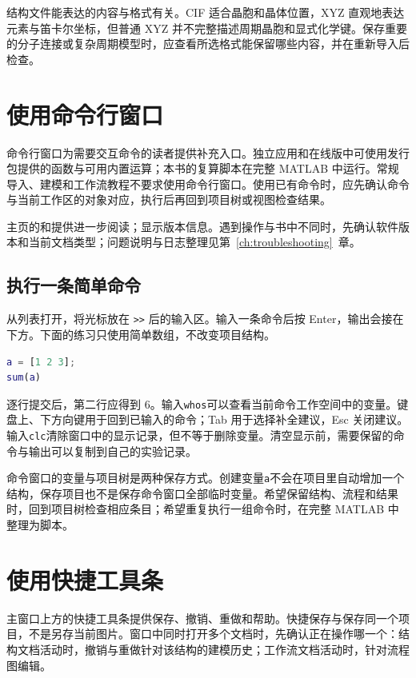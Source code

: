 结构文件能表达的内容与格式有关。CIF 适合晶胞和晶体位置，XYZ 直观地表达元素与笛卡尔坐标，但普通 XYZ 并不完整描述周期晶胞和显式化学键。保存重要的分子连接或复杂周期模型时，应查看所选格式能保留哪些内容，并在重新导入后检查。

\section{使用命令行窗口}
命令行窗口为需要交互命令的读者提供补充入口。独立应用和在线版中可使用发行包提供的函数与可用内置运算；本书的复算脚本在完整 MATLAB\regmark{} 中运行。常规导入、建模和工作流教程不要求使用命令行窗口。使用已有命令时，应先确认命令与当前工作区的对象对应，执行后再回到项目树或视图检查结果。

主页的和提供进一步阅读；显示版本信息。遇到操作与书中不同时，先确认软件版本和当前文档类型；问题说明与日志整理见第~\ref{ch:troubleshooting}~章。

\subsection{执行一条简单命令}

从列表打开，将光标放在 \texttt{>>} 后的输入区。输入一条命令后按 Enter，输出会接在下方。下面的练习只使用简单数组，不改变项目结构。

\begin{lstlisting}[language=Matlab]
a = [1 2 3];
sum(a)
\end{lstlisting}

逐行提交后，第二行应得到 6。输入\texttt{whos}可以查看当前命令工作空间中的变量。键盘上、下方向键用于回到已输入的命令；Tab 用于选择补全建议，Esc 关闭建议。输入\texttt{clc}清除窗口中的显示记录，但不等于删除变量。清空显示前，需要保留的命令与输出可以复制到自己的实验记录。

命令窗口的变量与项目树是两种保存方式。创建变量\texttt{a}不会在项目里自动增加一个结构，保存项目也不是保存命令窗口全部临时变量。希望保留结构、流程和结果时，回到项目树检查相应条目；希望重复执行一组命令时，在完整 MATLAB\regmark{} 中整理为脚本。

\section{使用快捷工具条}

主窗口上方的快捷工具条提供保存、撤销、重做和帮助。快捷保存与保存同一个项目，不是另存当前图片。窗口中同时打开多个文档时，先确认正在操作哪一个：结构文档活动时，撤销与重做针对该结构的建模历史；工作流文档活动时，针对流程图编辑。

